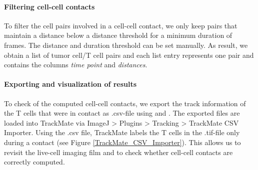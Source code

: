 \documentclass{report}
\begin{document}
\paragraph{Filtering cell-cell contacts}
To filter the cell pairs involved in a cell-cell contact, we only keep pairs that maintain a distance below a distance threshold for a minimum duration of frames. The distance and duration threshold can be set manually. As result, we obtain a list of tumor cell/T cell pairs and each list entry represents one pair and contains the columns \textit{time point} and \textit{distances}. 

%	
%
%

\paragraph{Exporting and visualization of results}
To check of the computed cell-cell contacts, we export the track information of the T cells that were in contact as .csv-file using  and . The exported files are loaded into TrackMate via ImageJ > Plugins > Tracking > TrackMate CSV Importer. Using the .csv file, TrackMate labels the T cells in the .tif-file only during a contact (see Figure \ref{TrackMate_CSV_Importer}). This allows us to revisit the live-cell imaging film and to check whether cell-cell contacts are correctly computed.
\end{document}
